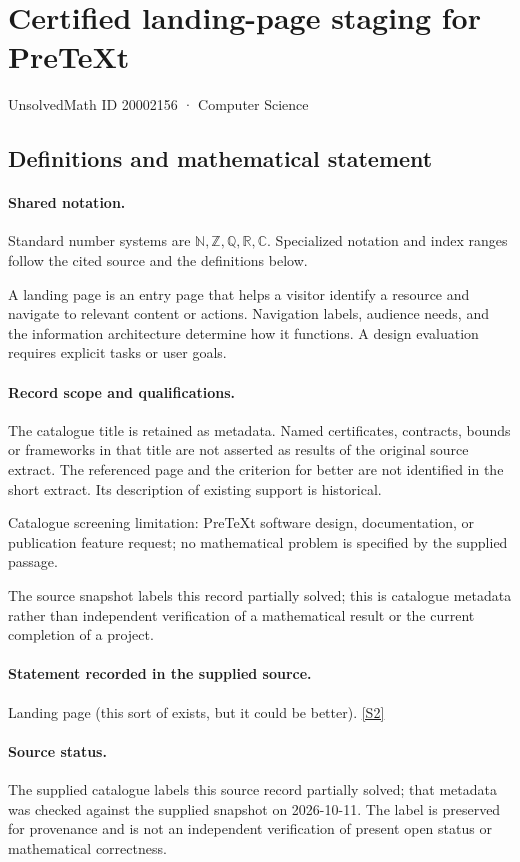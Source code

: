 \documentclass[11pt]{article}
\newcommand{\sref}[2]{\hyperlink{source:#1:#2}{[S#2]}}
\begin{document}
\setcounter{section}{20002155}
\section{Certified landing-page staging for PreTeXt}\label{20002156}
{\small\sffamily UnsolvedMath ID 20002156 · Computer Science}
\subsection{Definitions and mathematical statement}

\paragraph{Shared notation.}Standard number systems are $\mathbb N,\mathbb Z,\mathbb Q,\mathbb R,\mathbb C$. Specialized notation and index ranges follow the cited source and the definitions below.


A landing page is an entry page that helps a visitor identify a resource and navigate to relevant content or actions. Navigation labels, audience needs, and the information architecture determine how it functions. A design evaluation requires explicit tasks or user goals.
\paragraph{Record scope and qualifications.}
The catalogue title is retained as metadata. Named certificates, contracts, bounds or frameworks in that title are not asserted as results of the original source extract.
The referenced page and the criterion for better are not identified in the short extract. Its description of existing support is historical.

Catalogue screening limitation: PreTeXt software design, documentation, or publication feature request; no mathematical problem is specified by the supplied passage.

The source snapshot labels this record partially solved; this is catalogue metadata rather than independent verification of a mathematical result or the current completion of a project.
\paragraph{Statement recorded in the supplied source.}
Landing page (this sort of exists, but it could be better). \sref{20002156}{2}
\paragraph{Source status.}
The supplied catalogue labels this source record partially solved; that metadata was checked against the supplied snapshot on 2026-10-11. The label is preserved for provenance and is not an independent verification of present open status or mathematical correctness.
\end{document}
